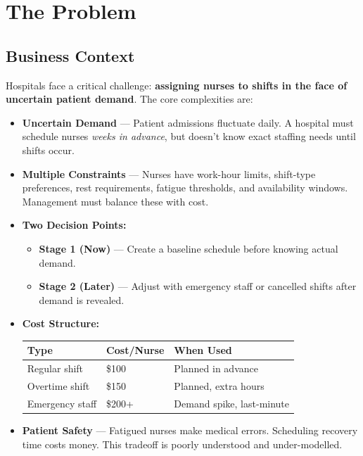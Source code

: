 \documentclass[12pt,a4paper]{article}
\begin{document}
\tableofcontents
\newpage

\section{The Problem}

\subsection{Business Context}

Hospitals face a critical challenge: \textbf{assigning nurses to shifts in the face of uncertain patient demand}. The core complexities are:

\begin{itemize}[leftmargin=18pt, itemsep=4pt]
  \item \textbf{Uncertain Demand} — Patient admissions fluctuate daily. A hospital must schedule nurses \emph{weeks in advance}, but doesn't know exact staffing needs until shifts occur.

  \item \textbf{Multiple Constraints} — Nurses have work-hour limits, shift-type preferences, rest requirements, fatigue thresholds, and availability windows. Management must balance these with cost.

  \item \textbf{Two Decision Points:}
    \begin{itemize}[itemsep=2pt]
      \item \textbf{Stage 1 (Now)} — Create a baseline schedule before knowing actual demand.
      \item \textbf{Stage 2 (Later)} — Adjust with emergency staff or cancelled shifts after demand is revealed.
    \end{itemize}

  \item \textbf{Cost Structure:}
    \begin{center}
      \begin{tabular}{lll}
        \toprule
        \textbf{Type} & \textbf{Cost/Nurse} & \textbf{When Used} \\
        \midrule
        Regular shift   & \$100 & Planned in advance \\
        Overtime shift  & \$150 & Planned, extra hours \\
        Emergency staff & \$200+ & Demand spike, last-minute \\
        \bottomrule
      \end{tabular}
    \end{center}

  \item \textbf{Patient Safety} — Fatigued nurses make medical errors. Scheduling recovery time costs money. This tradeoff is poorly understood and under-modelled.
\end{itemize}
\end{document}
